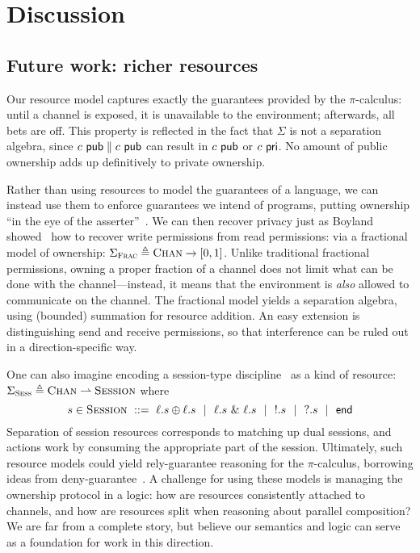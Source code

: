 \documentclass{entcs}
\begin{document}
\section{Discussion}

\subsection{Future work: richer resources}
\label{sec:resources}

Our resource model captures exactly the guarantees provided by the
$\pi$-calculus: until a channel is exposed, it is unavailable to the
environment; afterwards, all bets are off.  This property is reflected
in the fact that $\Sigma$ is not a separation algebra, since $c\ \textsf{pub}
\parallel c\ \textsf{pub}$ can result in $c\ \pub$ or $c\ \textsf{pri}$.  No amount of
public ownership adds up definitively to private ownership.

Rather than using resources to model the guarantees of a language, we
can instead use them to enforce guarantees we intend of programs, putting
ownership ``in the eye of the asserter''~\cite{O'Hearn2007}.  We can
then recover privacy just as Boyland showed~\cite{Boyland2003} how to
recover write permissions from read permissions: via a
fractional model of ownership: $ \Sigma_{\textsc{Frac}} \triangleq
\textsc{Chan} \rightarrow [0, 1] $.  Unlike traditional fractional
permissions, owning a proper fraction of a channel does not limit what
can be done with the channel---instead, it means that the environment
is \emph{also} allowed to communicate on the channel.  The fractional
model yields a separation algebra, using (bounded) summation for
resource addition.  An easy extension is distinguishing send
and receive permissions, so that interference can be ruled out in a
direction-specific way.

One can also imagine encoding a session-type discipline~\cite{Honda1998} as a
kind of resource: $\Sigma_\textsc{Sess} \triangleq \textsc{Chan}
\rightharpoonup \textsc{Session}$ where
\[
   s \in \textsc{Session}\ ::=\ 
     \ell.s \oplus \ell.s \GA \ell.s\ \&\ \ell.s \GA !.s \GA ?.s \GA \textsf{end} 
\]
Separation of session resources corresponds to matching up dual
sessions, and actions work by consuming the appropriate part of the
session.  Ultimately, such resource models could yield rely-guarantee
reasoning for the $\pi$-calculus, borrowing ideas from
deny-guarantee~\cite{Dodds2009}.  A challenge for using these models
is managing the ownership protocol in a logic: how are resources
consistently attached to channels, and how are resources split when
reasoning about parallel composition?  We are far from a complete
story, but believe our semantics and logic can serve as a foundation
for work in this direction.
\end{document}
